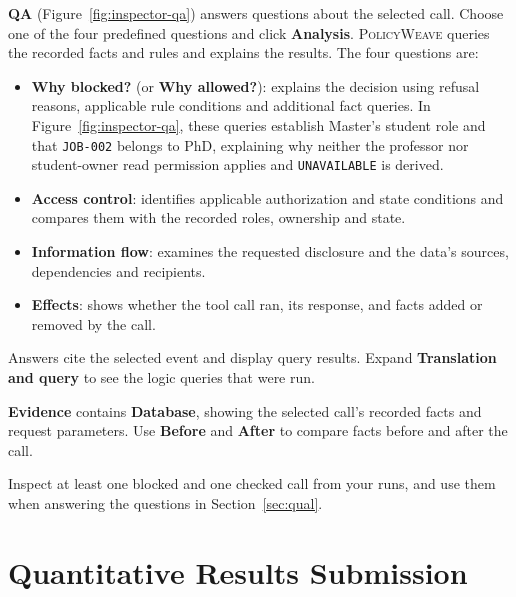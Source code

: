 \documentclass[10pt,letterpaper]{article}
\newcommand{\tool}{\textsc{PolicyWeave}}
\begin{document}
\textbf{QA} (Figure~\ref{fig:inspector-qa}) answers questions about the
selected call. Choose one of the four predefined questions and click
\textbf{Analysis}. {\tool} queries the recorded facts and rules and explains
the results. The four questions are:
\begin{itemize}
\item \textbf{Why blocked?} (or \textbf{Why allowed?}): explains the decision
using refusal reasons, applicable rule conditions and additional fact queries.
In Figure~\ref{fig:inspector-qa}, these queries establish Master's student role
and that \texttt{JOB-002} belongs to PhD, explaining why neither the professor
nor student-owner read permission applies and \texttt{UNAVAILABLE} is derived.
\item \textbf{Access control}: identifies applicable authorization and state
conditions and compares them with the recorded roles, ownership and state.
\item \textbf{Information flow}: examines the requested disclosure and
the data's sources, dependencies and recipients.
\item \textbf{Effects}: shows whether the tool call ran, its response,
and facts added or removed by the call.
\end{itemize}
Answers cite the selected event and display query results. Expand
\textbf{Translation and query} to see the logic queries that were run.

\textbf{Evidence} contains \textbf{Database}, showing the selected call's
recorded facts and request parameters. Use \textbf{Before} and \textbf{After}
to compare facts before and after the call.

Inspect at least one blocked and one checked call from your runs, and use them
when answering the questions in Section~\ref{sec:qual}.
\section{Quantitative Results Submission}
\end{document}
